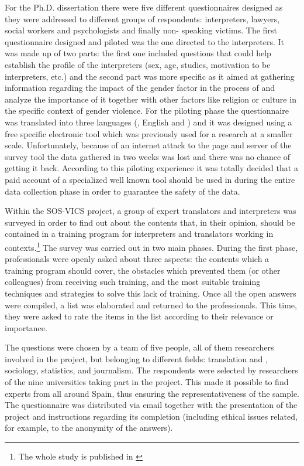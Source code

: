 \documentclass[output=paper]{LSP/langsci}
\begin{document}
  For the Ph.D. dissertation there were five different questionnaires designed as they were addressed to different groups of respondents: interpreters, lawyers, social workers and psychologists and finally non- speaking victims. The first questionnaire designed and piloted was the one directed to the interpreters. It was made up of two parts: the first one included questions that could help establish the profile of the interpreters (sex, age, studies, motivation to be interpreters, etc.) and the second part was more specific as it aimed at gathering information regarding the impact of the gender factor in the process of  and analyze the importance of it together with other factors like religion or culture in the specific context of gender violence. For the piloting phase the questionnaire was translated into three languages (, English and ) and it was designed using a free specific electronic tool which was previously used for a research at a smaller scale. Unfortunately, because of an internet attack to the page and server of the survey tool the data gathered in two weeks was lost and there was no chance of getting it back. According to this piloting experience it was totally decided that a paid account of a specialized well known tool should be used in during the entire data collection phase in order to guarantee the safety of the data. 

Within the SOS-VICS project, a group of expert translators and interpreters was surveyed in order to find out about the contents that, in their opinion, should be contained in a training program for interpreters and translators working in  contexts.\footnote{The whole study is published in \citet{DelPozo2013Formacion}} The survey was carried out in two main phases. During the first phase, professionals were openly asked about three aspects: the contents which a training program should cover, the obstacles which prevented them (or other colleagues) from receiving such training, and the most suitable training techniques and strategies to solve this lack of training. Once all the open answers were compiled, a list was elaborated and returned to the professionals. This time, they were asked to rate the items in the list according to their relevance or importance. 

The questions were chosen by a team of five people, all of them researchers involved in the project, but belonging to different fields: translation and , sociology, statistics, and journalism. The respondents were selected by researchers of the nine  universities taking part in the project. This made it possible to find experts from all around Spain, thus ensuring the representativeness of the sample. The questionnaire was distributed via email together with the presentation of the project and instructions regarding its completion (including ethical issues related, for example, to the anonymity of the answers).
\end{document}
